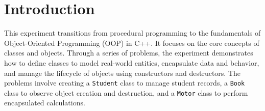\section{Introduction}

This experiment transitions from procedural programming to the fundamentals of Object-Oriented Programming (OOP) in C++. It focuses on the core concepts of classes and objects. Through a series of problems, the experiment demonstrates how to define classes to model real-world entities, encapsulate data and behavior, and manage the lifecycle of objects using constructors and destructors. The problems involve creating a \texttt{Student} class to manage student records, a \texttt{Book} class to observe object creation and destruction, and a \texttt{Motor} class to perform encapsulated calculations.
